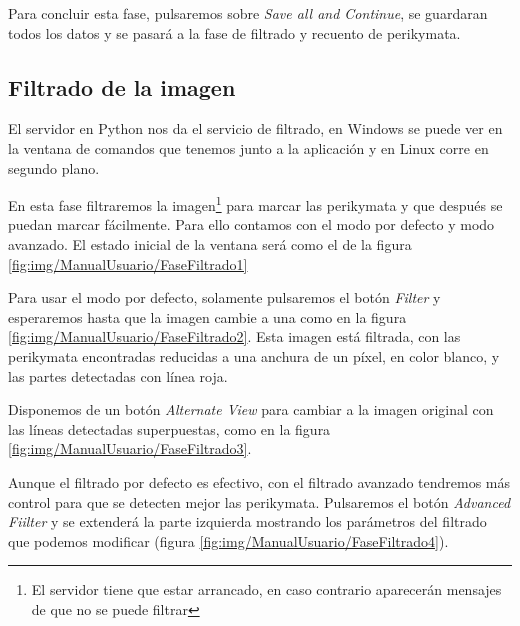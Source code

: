 Para concluir esta fase, pulsaremos sobre \textit{Save all and Continue}, se guardaran todos los datos y se pasará a la fase de filtrado y recuento de perikymata.

\subsection{Filtrado de la imagen}
El servidor en Python nos da el servicio de filtrado, en Windows se puede ver en la ventana de comandos que tenemos junto a la aplicación y en Linux corre en segundo plano.



En esta fase filtraremos la imagen\footnote{El servidor tiene que estar arrancado, en caso contrario aparecerán mensajes de que no se puede filtrar} para marcar las perikymata y que después se puedan marcar fácilmente. Para ello contamos con el modo por defecto y modo avanzado. El estado inicial de la ventana será como el de la figura \ref{fig:img/ManualUsuario/FaseFiltrado1}



Para usar el modo por defecto, solamente pulsaremos el botón \textit{Filter} y esperaremos hasta que la imagen cambie a una como en la figura \ref{fig:img/ManualUsuario/FaseFiltrado2}. Esta imagen está filtrada, con las perikymata encontradas reducidas a una anchura de un píxel, en color blanco, y las partes detectadas con línea roja.

Disponemos de un botón \textit{Alternate View} para cambiar a la imagen original con las líneas detectadas superpuestas, como en la figura \ref{fig:img/ManualUsuario/FaseFiltrado3}.

Aunque el filtrado por defecto es efectivo, con el filtrado avanzado tendremos más control para que se detecten mejor las perikymata. Pulsaremos el botón \textit{Advanced Fiilter} y se extenderá la parte izquierda mostrando los parámetros del filtrado que podemos modificar (figura \ref{fig:img/ManualUsuario/FaseFiltrado4}).

